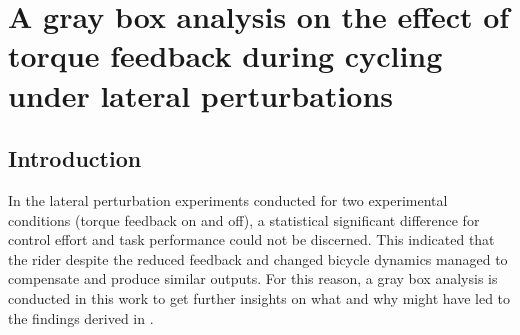 \chapter{A gray box analysis on the effect of torque feedback during cycling under lateral perturbations} \label{hapticFB}

\section{Introduction}

In the lateral perturbation experiments conducted for two experimental conditions (torque feedback on and off), a statistical significant difference for control effort and task performance  could not be discerned. This indicated that the  rider despite the reduced feedback and changed bicycle dynamics managed to compensate and produce similar outputs. For this reason, a gray box analysis is conducted in this work to get further insights on what and why might have led to the findings derived in \cite{dialynaseffect}.

